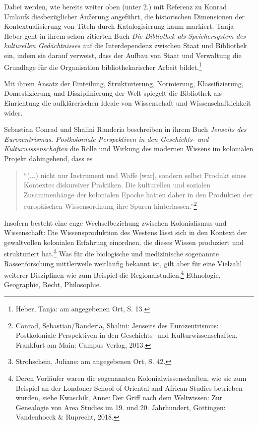 \documentclass[a4paper,
fontsize=11pt,
oneside,
numbers=noperiodatend,
parskip=half-,
bibliography=totoc,
final
]{scrartcl}
\begin{document}
Dabei werden, wie bereits weiter oben (unter 2.) mit Referenz zu Konrad
Umlaufs diesbezüglicher Äußerung angeführt, die historischen Dimensionen
der Kontextualisierung von Titeln durch Katalogisierung kaum markiert.
Tanja Heber geht in ihrem schon zitierten Buch \emph{Die Bibliothek als
Speichersystem des kulturellen Gedächtnisses} auf die Interdependenz
zwischen Staat und Bibliothek ein, indem sie darauf verweist, dass der
Aufbau von Staat und Verwaltung die Grundlage für die Organisation
bibliothekarischer Arbeit bildet.\footnote{Heber, Tanja: am angegebenen
  Ort, S. 13.}

Mit ihrem Ansatz der Einteilung, Strukturierung, Normierung,
Klassifizierung, Domestizierung und Disziplinierung der Welt spiegelt
die Bibliothek als Einrichtung die aufklärerischen Ideale von
Wissenschaft und Wissenschaftlichkeit wider.

Sebastian Conrad und Shalini Randeria beschreiben in ihrem Buch
\emph{Jenseits des Eurozentrismus. Postkoloniale Perspektiven in den
Geschichts- und Kulturwissenschaften} die Rolle und Wirkung des modernen
Wissens im kolonialen Projekt dahingehend, dass es

\begin{quote}
\enquote{(...) nicht nur Instrument und Waffe {[}war{]}, sondern selbst
Produkt eines Kontextes diskursiver Praktiken. Die kulturellen und
sozialen Zusammenhänge der kolonialen Epoche hatten daher in den
Produkten der europäischen Wissensordnung ihre Spuren
hinterlassen.}\footnote{Conrad, Sebastian/Randeria, Shalini: Jenseits
  des Eurozentrismus: Postkoloniale Perspektiven in den Geschichts- und
  Kulturwissenschaften, Frankfurt am Main: Campus Verlag, 2013.}
\end{quote}

Insofern besteht eine enge Wechselbeziehung zwischen Kolonialismus und
Wissenschaft: Die Wissensproduktion des Westens lässt sich in den
Kontext der gewaltvollen kolonialen Erfahrung einordnen, die dieses
Wissen produziert und strukturiert hat.\footnote{Strohschein, Juliane:
  am angegebenen Ort, S. 42.} Was für die biologische und medizinische
sogenannte Rassenforschung mittlerweile weitläufig bekannt ist, gilt
aber für eine Vielzahl weiterer Disziplinen wie zum Beispiel die
Regionalstudien,\footnote{Deren Vorläufer waren die sogenannten
  Kolonialwissenschaften, wie sie zum Beispiel an der Londoner School of
  Oriental and African Studies betrieben wurden, siehe Kwaschik, Anne:
  Der Griff nach dem Weltwissen: Zur Genealogie von Area Studies im 19.
  und 20. Jahrhundert, Göttingen: Vandenhoeck \& Ruprecht, 2018.}
Ethnologie, Geographie, Recht, Philosophie.
\end{document}
